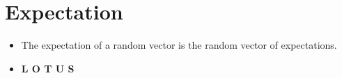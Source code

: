 \section{Expectation}
\begin{itemize}
\item The expectation of a random vector is the random vector of expectations.
\item \textbf{L O T U S}
\end{itemize}
